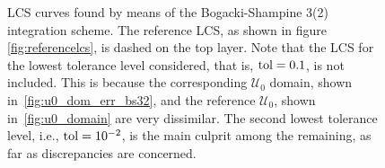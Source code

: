 \begin{figure}[htpb]
    \centering
    
    \caption[LCS curves found by means of the Bogacki-Shampine 3(2) integration
    scheme]{
        LCS curves found by means of the Bogacki-Shampine 3(2) integration
        scheme. The reference LCS, as shown in figure
        \ref{fig:referencelcs}, is dashed on the top layer. Note that
        the LCS for the lowest tolerance level considered, that is,
        $\textnormal{tol}=0.1$,
        is not included. This is because the corresponding $\mathcal{U}_{0}$
        domain, shown in~\cref{fig:u0_dom_err_bs32}, and the reference
        $\mathcal{U}_{0}$, shown in~\cref{fig:u0_domain} are very
        dissimilar. The second lowest tolerance level, i.e., $\textnormal{tol}=10^{-2}$,
        is the main culprit among the remaining, as far as discrepancies are
    concerned.}
    \label{fig:lcs_rkbs32}
\end{figure}
